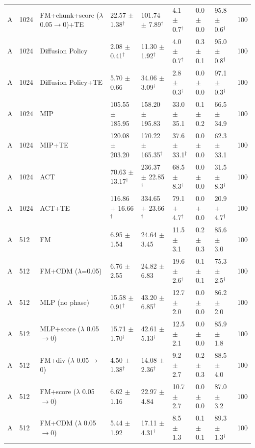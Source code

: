 \begin{tabular}{lllllllll}
A & 1024 & FM+chunk+score ($\lambda$ 0.05$\to$0)+TE & 22.57 $\pm$ 1.38$^\dagger$ & 101.74 $\pm$ 7.89$^\dagger$ & 4.1 $\pm$ 0.7$^\dagger$ & 0.0 $\pm$ 0.0 & 95.8 $\pm$ 0.6$^\dagger$ & 100 \\
A & 1024 & Diffusion Policy & 2.08 $\pm$ 0.41$^\dagger$ & 11.30 $\pm$ 1.92$^\dagger$ & 4.0 $\pm$ 0.7$^\dagger$ & 0.3 $\pm$ 0.1 & 95.0 $\pm$ 0.8$^\dagger$ & 100 \\
A & 1024 & Diffusion Policy+TE & 5.70 $\pm$ 0.66 & 34.06 $\pm$ 3.09$^\dagger$ & 2.8 $\pm$ 0.3$^\dagger$ & 0.0 $\pm$ 0.0 & 97.1 $\pm$ 0.3$^\dagger$ & 100 \\
A & 1024 & MIP & 105.55 $\pm$ 185.95 & 158.20 $\pm$ 195.83 & 33.0 $\pm$ 35.1 & 0.1 $\pm$ 0.2 & 66.5 $\pm$ 34.9 & 100 \\
A & 1024 & MIP+TE & 120.08 $\pm$ 203.20 & 170.22 $\pm$ 165.35$^\dagger$ & 37.6 $\pm$ 33.1$^\dagger$ & 0.0 $\pm$ 0.0 & 62.3 $\pm$ 33.1 & 100 \\
A & 1024 & ACT & 70.63 $\pm$ 13.17$^\dagger$ & 236.37 $\pm$ 22.85$^\dagger$ & 68.5 $\pm$ 8.3$^\dagger$ & 0.0 $\pm$ 0.0 & 31.5 $\pm$ 8.3$^\dagger$ & 100 \\
A & 1024 & ACT+TE & 116.86 $\pm$ 16.66$^\dagger$ & 334.65 $\pm$ 23.66$^\dagger$ & 79.1 $\pm$ 4.7$^\dagger$ & 0.0 $\pm$ 0.0 & 20.9 $\pm$ 4.7$^\dagger$ & 100 \\
A & 512 & FM & 6.95 $\pm$ 1.54 & 24.64 $\pm$ 3.45 & 11.5 $\pm$ 3.1 & 0.2 $\pm$ 0.3 & 85.6 $\pm$ 3.0 & 100 \\
A & 512 & FM+CDM ($\lambda$=0.05) & 6.76 $\pm$ 2.55 & 24.82 $\pm$ 6.83 & 19.6 $\pm$ 2.6$^\dagger$ & 0.1 $\pm$ 0.1 & 75.3 $\pm$ 2.5$^\dagger$ & 100 \\
A & 512 & MLP (no phase) & 15.58 $\pm$ 0.91$^\dagger$ & 43.20 $\pm$ 6.85$^\dagger$ & 12.7 $\pm$ 2.0 & 0.0 $\pm$ 0.0 & 86.2 $\pm$ 2.0 & 100 \\
A & 512 & MLP+score ($\lambda$ 0.05$\to$0) & 15.71 $\pm$ 1.70$^\dagger$ & 42.61 $\pm$ 5.13$^\dagger$ & 12.5 $\pm$ 2.1 & 0.0 $\pm$ 0.0 & 85.9 $\pm$ 1.8 & 100 \\
A & 512 & FM+div ($\lambda$ 0.05$\to$0) & 4.50 $\pm$ 1.38$^\dagger$ & 14.08 $\pm$ 2.36$^\dagger$ & 9.2 $\pm$ 2.7 & 0.2 $\pm$ 0.3 & 88.5 $\pm$ 4.0 & 100 \\
A & 512 & FM+score ($\lambda$ 0.05$\to$0) & 6.62 $\pm$ 1.16 & 22.97 $\pm$ 4.84 & 10.7 $\pm$ 2.7 & 0.0 $\pm$ 0.0 & 87.0 $\pm$ 3.2 & 100 \\
A & 512 & FM+CDM ($\lambda$ 0.05$\to$0) & 5.44 $\pm$ 1.92 & 17.11 $\pm$ 4.31$^\dagger$ & 8.5 $\pm$ 1.3 & 0.1 $\pm$ 0.1 & 89.3 $\pm$ 1.3$^\dagger$ & 100 \\

\end{tabular}
